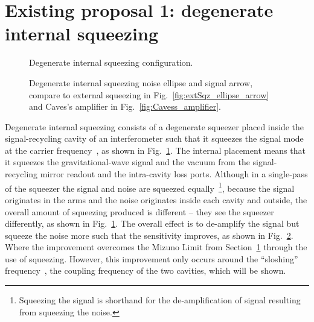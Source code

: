 \section{Existing proposal 1: degenerate internal squeezing}

\begin{figure}
	\centering
	\caption{Degenerate internal squeezing configuration.}
	\label{fig:dIS_config}
\end{figure}

\begin{figure}
	\centering
	\caption{Degenerate internal squeezing noise ellipse and signal arrow, compare to external squeezing in Fig.~\ref{fig:extSqz_ellipse_arrow} and Caves's amplifier in Fig.~\ref{fig:Cavess_amplifier}.}
	\label{fig:dIS_ellipse_and_arrow}
\end{figure}

Degenerate internal squeezing consists of a degenerate squeezer placed inside the signal-recycling cavity of an interferometer such that it squeezes the signal mode at the carrier frequency~\cite{}, as shown in Fig.~\ref{fig:dIS_config}. The internal placement means that it squeezes the gravitational-wave signal and the vacuum from the signal-recycling mirror readout and the intra-cavity loss ports. Although in a single-pass of the squeezer the signal and noise are squeezed equally~\footnote{Squeezing the signal is shorthand for the de-amplification of signal resulting from squeezing the noise. }, because the signal originates in the arms and the noise originates inside each cavity and outside, the overall amount of squeezing produced is different -- they see the squeezer differently, as shown in Fig.~\ref{fig:dIS_config}. The overall effect is to de-amplify the signal but squeeze the noise more such that the sensitivity improves, as shown in Fig.~\ref{fig:dIS_ellipse_and_arrow}. Where the improvement overcomes the Mizuno Limit from Section~\ref{} through the use of squeezing. However, this improvement only occurs around the ``sloshing'' frequency~\cite{}, the coupling frequency of the two cavities, which will be shown. 

